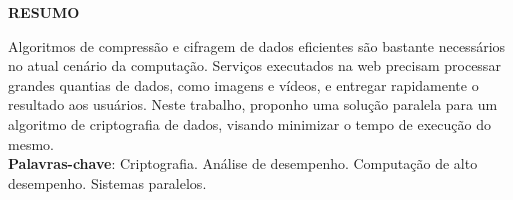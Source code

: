 
\begin{center}
        {\large\bfseries RESUMO}
\end{center}
    Algoritmos de compressão e cifragem de dados eficientes são bastante necessários no atual cenário da computação. Serviços executados na web precisam processar grandes quantias de dados, como imagens e vídeos, e entregar rapidamente o resultado aos usuários. Neste trabalho, proponho uma solução paralela para um algoritmo de criptografia de dados, visando minimizar o tempo de execução do mesmo.\\
 \textbf{Palavras-chave}: Criptografia. Análise de desempenho. Computação de alto desempenho. Sistemas paralelos.
 


%
%
%
